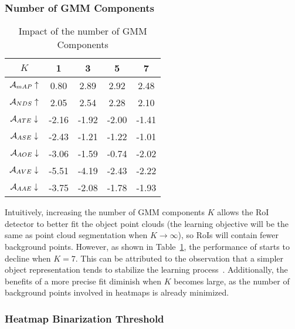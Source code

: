 \vspace{-0.2cm}
\subsubsection{Number of GMM Components}

\begin{table}[ht]
\vspace{-0.4cm}
\centering
\renewcommand{\arraystretch}{\TABVSPACE} %
\setlength{\tabcolsep}{10pt} %
\caption{Impact of the number of GMM Components}
\begin{tabular}{c|c|c|c|c}
\hline
$K$ & 1 & 3 & 5 & 7 \\
\hline
        $\mathcal{A}_{mAP}\uparrow$ & 0.80 & 2.89 & 2.92 & 2.48 \\ 
        $\mathcal{A}_{NDS}\uparrow$ & 2.05 & 2.54 & 2.28 & 2.10 \\ 
        $\mathcal{A}_{ATE}\downarrow$ & -2.16 & -1.92 & -2.00 & -1.41 \\ 
        $\mathcal{A}_{ASE}\downarrow$ & -2.43 & -1.21 & -1.22 & -1.01 \\ 
        $\mathcal{A}_{AOE}\downarrow$ & -3.06 & -1.59 & -0.74 & -2.02 \\ 
        $\mathcal{A}_{AVE}\downarrow$ & -5.51 & -4.19 & -2.43 & -2.22 \\ 
        $\mathcal{A}_{AAE}\downarrow$ & -3.75 & -2.08 & -1.78 & -1.93 \\ 
\hline
\end{tabular}
\label{tab-abla-GMM-K}
\vspace{-0.2cm}
\end{table}


Intuitively, increasing the number of GMM components $K$ allows the RoI detector to better fit the object point clouds (the learning objective will be the same as point cloud segmentation when $K\to \infty$), so RoIs will contain fewer background points. However, as shown in Table~\ref{tab-abla-GMM-K}, the performance of \methodname{} starts to decline when $K=7$. This can be attributed to the observation that a simpler object representation tends to stabilize the learning process~\cite{yin2021center, zhou2019objects}. Additionally, the benefits of a more precise fit diminish when $K$ becomes large, as the number of background points involved in heatmaps is already minimized.


\vspace{-0.2cm}
\subsubsection{Heatmap Binarization Threshold}


